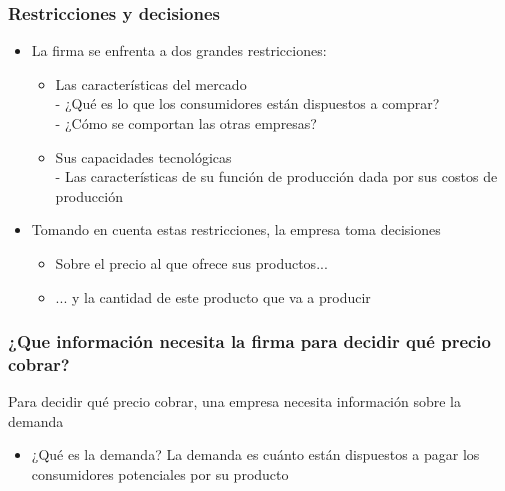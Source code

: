 \documentclass{beamer}
\begin{document}
\begin{frame}
\frametitle{Restricciones y decisiones}
\begin{itemize}
    \item La firma se enfrenta a dos grandes restricciones:
        \begin{itemize}
        \item Las características del mercado \\
        - ¿Qué es lo que los consumidores están dispuestos a comprar? \\
        - ¿Cómo se comportan las otras empresas?
        \item Sus capacidades tecnológicas \\
        - Las características de su función de producción dada por sus costos de producción
        \end{itemize}
    \item Tomando en cuenta estas restricciones, la empresa toma decisiones
    \begin{itemize}
        \item Sobre el precio al que ofrece sus productos...
        \item ... y la cantidad de este producto que va a producir
    \end{itemize}
\end{itemize} 
\end{frame}

\begin{frame}
\frametitle{¿Que información necesita la firma para decidir qué precio cobrar?}
    Para decidir qué precio cobrar, una empresa necesita información sobre la demanda
    \begin{itemize}
        \item ¿Qué es la demanda?
    La demanda es cuánto están dispuestos a pagar los consumidores potenciales por su producto
    \end{itemize}
\end{frame}
\end{document}
